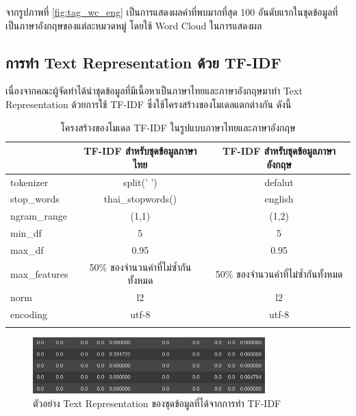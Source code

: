 \documentclass[12pt,oneside,openright,a4paper]{cpe-thai-project}
\begin{document}
        \hspace{1cm}จากรูปภาพที่ \ref{fig:tag_wc_eng} เป็นการแสดงผลคำที่พบมากที่สุด 100 อันดับแรกในชุดข้อมูลที่เป็นภาษาอังกฤษของแต่ละหมวดหมู่ โดยใช้ Word Cloud ในการแสดงผล
        \newpage

    \subsection{การทำ Text Representation ด้วย TF-IDF}
      \hspace{1cm}เนื่องจากคณะผู้จัดทำได้นำชุดข้อมูลที่มีเนื้อหาเป็นภาษาไทยและภาษาอังกฤษมาทำ Text Representation ด้วยการใช้ TF-IDF ซึ่งใช้โครงสร้างของโมเดลแตกต่างกัน ดังนี้ 
      \begin{longtable}[!ht]{lcc}
        \caption{โครงสร้างของโมเดล TF-IDF ในรูปแบบภาษาไทยและภาษาอังกฤษ}\label{tbl:tfidf_feature} \\
        \hhline{===}
        \multicolumn{1}{c}{\textbf{โครงสร้าง}} & \textbf{TF-IDF สำหรับชุดข้อมูลภาษาไทย} & \textbf{TF-IDF สำหรับชุดข้อมูลภาษาอังกฤษ} \\ \hline
        \endhead
        tokenizer     & split(' ')        & defalut      \\ 
        stop\_words   & thai\_stopwords() & english      \\ 
        ngram\_range  & (1,1)             & (1,2)        \\ 
        min\_df       & 5                 & 5            \\ 
        max\_df       & 0.95              & 0.95         \\ 
        max\_features & 50\% ของจำนวนคำที่ไม่ซ้ำกันทั้งหมด             & 50\% ของจำนวนคำที่ไม่ซ้ำกันทั้งหมด       \\ 
        norm          & l2                & l2           \\ 
        encoding      & utf-8             & utf-8        \\ \hhline{===}
      \end{longtable} 
      \begin{figure}[!ht]\centering
        \includegraphics[width=0.8\textwidth]{./img/tfidf_vector.png}
        \caption{ตัวอย่าง Text Representation ของชุดข้อมูลที่ได้จากการทำ TF-IDF}\label{fig:tfidf_vec}
      \end{figure}
\end{document}
